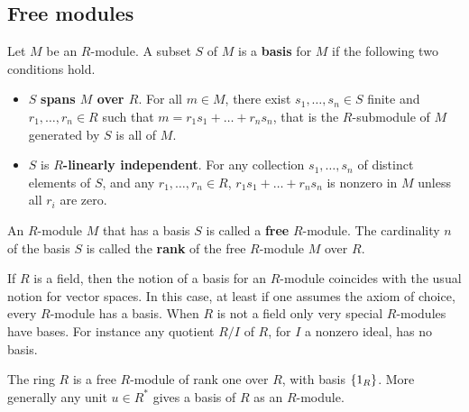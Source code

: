 \pagebreak

\subsection{Free modules}

\begin{definition}
Let $ M $ be an $ R $-module. A subset $ S $ of $ M $ is a \textbf{basis} for $ M $ if the following two conditions hold.
\begin{itemize}
\item $ S $ \textbf{spans $ M $ over $ R $}. For all $ m \in M $, there exist $ s_1, \dots, s_n \in S $ finite and $ r_1, \dots, r_n \in R $ such that $ m = r_1s_1 + \dots + r_ns_n $, that is the $ R $-submodule of $ M $ generated by $ S $ is all of $ M $.
\item $ S $ is \textbf{$ R $-linearly independent}. For any collection $ s_1, \dots, s_n $ of distinct elements of $ S $, and any $ r_1, \dots, r_n \in R $, $ r_1s_1 + \dots + r_ns_n $ is nonzero in $ M $ unless all $ r_i $ are zero.
\end{itemize}
\end{definition}

\begin{definition}
An $ R $-module $ M $ that has a basis $ S $ is called a \textbf{free} $ R $-module. The cardinality $ n $ of the basis $ S $ is called the \textbf{rank} of the free $ R $-module $ M $ over $ R $.
\end{definition}


\begin{remark}
If $ R $ is a field, then the notion of a basis for an $ R $-module coincides with the usual notion for vector spaces. In this case, at least if one assumes the axiom of choice, every $ R $-module has a basis. When $ R $ is not a field only very special $ R $-modules have bases. For instance any quotient $ R / I $ of $ R $, for $ I $ a nonzero ideal, has no basis.
\end{remark}

\begin{example*}
The ring $ R $ is a free $ R $-module of rank one over $ R $, with basis $ \left\{ 1_R \right\} $. More generally any unit $ u \in R^* $ gives a basis of $ R $ as an $ R $-module.
\end{example*}

